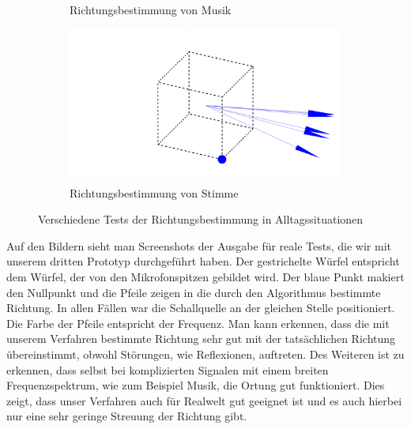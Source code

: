 \begin{figure}[H]
\begin{subfigure}[b]{0.475\textwidth}
    \caption{Richtungsbestimmung von Musik\label{fig:music}}
  \end{subfigure}
  \hfill
  \begin{subfigure}[b]{0.475\textwidth}
    \centering
    \includegraphics[width=\textwidth]{img/sprechen.png}
    \caption{Richtungsbestimmung von Stimme\label{fig:speech}}
  \end{subfigure}

  \caption{Verschiedene Tests der Richtungsbestimmung in Alltagssituationen\label{fig:tests}}
\end{figure}
Auf den Bildern sieht man Screenshots der Ausgabe für reale Tests, die wir mit unserem dritten Prototyp durchgeführt haben. Der gestrichelte Würfel entspricht dem Würfel, der von den Mikrofonspitzen gebildet wird. Der blaue Punkt makiert den Nullpunkt und die Pfeile zeigen in die durch den Algorithmus bestimmte Richtung. In allen Fällen war die Schallquelle an der gleichen Stelle positioniert. Die Farbe der Pfeile entspricht der Frequenz. Man kann erkennen, dass die mit unserem Verfahren bestimmte Richtung sehr gut mit der tatsächlichen Richtung übereinstimmt, obwohl Störungen, wie Reflexionen, auftreten. Des Weiteren ist zu erkennen, dass selbst bei komplizierten Signalen mit einem breiten Frequenzspektrum, wie zum Beispiel Musik, die Ortung gut funktioniert. Dies zeigt, dass unser Verfahren auch für Realwelt gut geeignet ist und es auch hierbei nur eine sehr geringe Streuung der Richtung gibt.